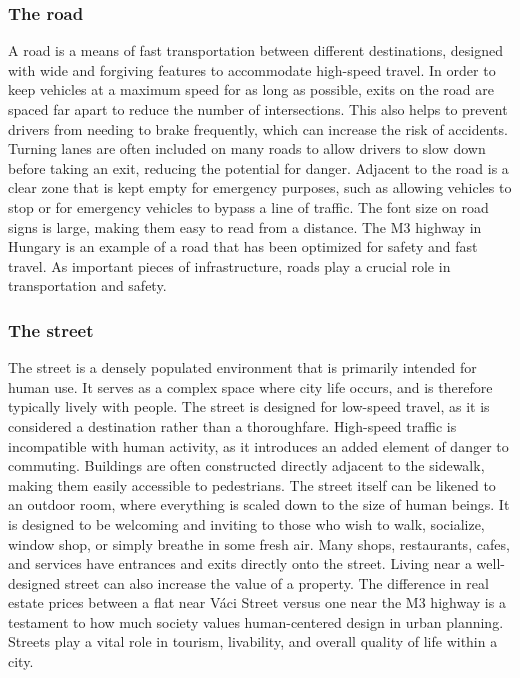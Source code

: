 \documentclass[
]{elteikthesis}[2023/04/10]
\begin{document}
\subsubsection*{The road}

A road is a means of fast transportation between different destinations,
designed with wide and forgiving features to accommodate high-speed
travel. In order to keep vehicles at a maximum speed for as long as
possible, exits on the road are spaced far apart to reduce the number
of intersections. This also helps to prevent drivers from needing
to brake frequently, which can increase the risk of accidents. Turning
lanes are often included on many roads to allow drivers to slow down
before taking an exit, reducing the potential for danger. Adjacent
to the road is a clear zone that is kept empty for emergency purposes,
such as allowing vehicles to stop or for emergency vehicles to bypass
a line of traffic. The font size on road signs is large, making them
easy to read from a distance. The M3 highway in Hungary is an example
of a road that has been optimized for safety and fast travel. As important
pieces of infrastructure, roads play a crucial role in transportation
and safety.

\subsubsection*{The street}

The street is a densely populated environment that is primarily intended
for human use. It serves as a complex space where city life occurs,
and is therefore typically lively with people. The street is designed
for low-speed travel, as it is considered a destination rather than
a thoroughfare. High-speed traffic is incompatible with human activity,
as it introduces an added element of danger to commuting. Buildings
are often constructed directly adjacent to the sidewalk, making them
easily accessible to pedestrians. The street itself can be likened
to an outdoor room, where everything is scaled down to the size of
human beings. It is designed to be welcoming and inviting to those
who wish to walk, socialize, window shop, or simply breathe in some
fresh air. Many shops, restaurants, cafes, and services have entrances
and exits directly onto the street. Living near a well-designed street
can also increase the value of a property. The difference in real
estate prices between a flat near Váci Street versus one near the
M3 highway is a testament to how much society values human-centered
design in urban planning. Streets play a vital role in tourism, livability,
and overall quality of life within a city.
\end{document}
